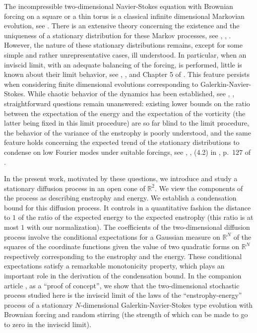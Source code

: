 \documentclass[12pt,leqno]{article}
\def\IR{{\mathbb R}}
\begin{document}
The incompressible two-dimensional Navier-Stokes equation with Brownian forcing on a square or a thin torus is a classical infinite dimensional Markovian evolution, see \cite{KuksShir12}. There is an extensive theory concerning the existence and the uniqueness of a stationary distribution for these Markov processes, see \cite{HairMatt06}, \cite{HairMatt11}, \cite{KuksShir12}. However, the nature of these stationary distributions remains, except for some simple and rather unrepresentative cases, ill understood. In particular, when an inviscid limit, with an adequate balancing of the forcing, is performed, little is known about their limit behavior, see \cite{GlatSverVico15}, \cite{Kuks08}, and Chapter 5 of \cite{KuksShir12}. This feature persists when considering finite dimensional evolutions corresponding to Galerkin-Navier-Stokes. While chaotic behavior of the dynamics has been established, see \cite{BedrBlumPuns22}, \cite{BedrPuns24}, straightforward questions remain unanswered: existing lower bounds on the ratio between the expectation of the energy and the expectation of the vorticity (the latter being fixed in this limit procedure) are so far blind to the limit procedure, the behavior of the variance of the enstrophy is poorly understood, and the same feature holds concerning the expected trend of the stationary distributions to condense on low Fourier modes under suitable forcings, see \cite{BeckCoopLordSpil20}, \cite{BoucSimo09}, (4.2) in \cite{LinkHohmEckh20},  p.~127 of \cite{Naza11}.

\medskip
In the present work, motivated by these questions, we introduce and study a stationary diffusion process in an open cone of $\IR^2$. We view the components of the process as describing enstrophy and energy. We establish a condensation bound for this diffusion process. It controls in a quantitative fashion the distance to $1$ of the ratio of the expected energy to the expected enstrophy (this ratio is at most $1$ with our normalization). The coefficients of the two-dimensional diffusion process involve the conditional expectations for a Gaussian measure on $\IR^N$ of the squares of the coordinate functions given the value of two quadratic forms on $\IR^N$ respectively corresponding to the enstrophy and the energy. These conditional expectations satisfy a remarkable monotonicity property, which plays an important role in the derivation of the condensation bound. In the companion article \cite{SzniWidm26b}, as a ``proof of concept'', we show that the two-dimensional stochastic process studied here is the inviscid limit of the laws of the ``enstrophy-energy'' process of a stationary $N$-dimensional Galerkin-Navier-Stokes type evolution with Brownian forcing and random stirring (the strength of which can be made to go to zero in the inviscid limit).
\end{document}

